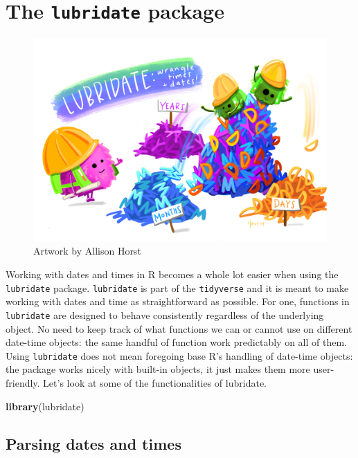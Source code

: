 \documentclass[
]{book}
\newenvironment{Shaded}{\begin{snugshade}}{\end{snugshade}}
\newcommand{\FunctionTok}[1]{\textcolor[rgb]{0.13,0.29,0.53}{\textbf{#1}}}
\newcommand{\NormalTok}[1]{#1}
\begin{document}
\hypertarget{the-lubridate-package}{%
\section{\texorpdfstring{The \texttt{lubridate} package}{The lubridate package}}\label{the-lubridate-package}}

\begin{figure}

{\centering \includegraphics[width=0.8\linewidth]{img/lubridate_ymd} 

}

\caption{Artwork by Allison Horst}\label{fig:lub}
\end{figure}

Working with dates and times in R becomes a whole lot easier when using the \texttt{lubridate} package. \texttt{lubridate} is part of the \texttt{tidyverse} and it is meant to make working with dates and time as straightforward as possible. For one, functions in \texttt{lubridate} are designed to behave consistently regardless of the underlying object. No need to keep track of what functions we can or cannot use on different date-time objects: the same handful of function work predictably on all of them. Using \texttt{lubridate} does not mean foregoing base R's handling of date-time objects: the package works nicely with built-in objects, it just makes them more user-friendly. Let's look at some of the functionalities of lubridate.

\begin{Shaded}
\begin{Highlighting}[]
\FunctionTok{library}\NormalTok{(lubridate)}
\end{Highlighting}
\end{Shaded}

\hypertarget{parsing-dates-and-times}{%
\subsection{Parsing dates and times}\label{parsing-dates-and-times}}
\end{document}
